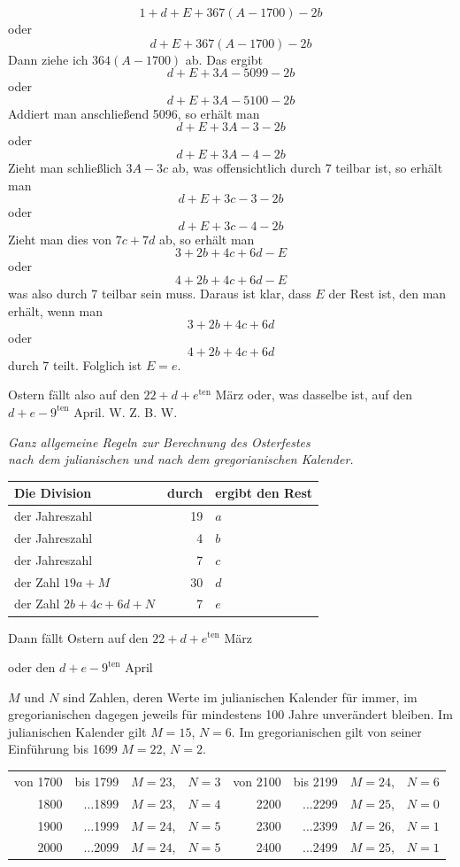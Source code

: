 %
\begingroup{}
\[
1+d+E+367(A-1700)-2b
\]
\endgroup
oder
\[
d+E+367(A-1700)-2b
\]
Dann ziehe ich $364(A-1700)$ ab. Das ergibt
\[
d+E+3A-5099-2b
\]
oder
\[
d+E+3A-5100-2b
\]
Addiert man anschließend 5096, so erhält man
\[
d+E+3A-3-2b
\]
oder
\[
d+E+3A-4-2b
\]
Zieht man schließlich $3A-3c$ ab, was offensichtlich durch 7 teilbar ist, so erhält man
\[
d+E+3c-3-2b
\]
oder
\[
d+E+3c-4-2b
\]
Zieht man dies von $7c+7d$ ab, so erhält man
\[
3+2b+4c+6d-E
\]
oder
\[
4+2b+4c+6d-E
\]
was also durch 7 teilbar sein muss. Daraus ist klar, dass $E$ der Rest ist, den man erhält, wenn man
\[
3+2b+4c+6d
\]
oder
\[
4+2b+4c+6d
\]
durch 7 teilt. Folglich ist $E=e$.

Ostern fällt also auf den $22+d+e^{\mathrm{ten}}$ März oder, was dasselbe ist, auf den $d+e-9^{\mathrm{ten}}$ April. W. Z. B. W.

%
\begin{center}\textit{Ganz allgemeine Regeln zur Berechnung des Osterfestes\\
nach dem julianischen und nach dem gregorianischen Kalender.}\end{center}
\begin{center}
\begin{tabular}{l|r|l}
Die Division & durch & ergibt den Rest\\\hline
der Jahreszahl & 19 & $a$\\
der Jahreszahl & 4 & $b$\\
der Jahreszahl & 7 & $c$\\
der Zahl $19a+M$ & 30 & $d$\\
der Zahl $2b+4c+6d+N$ & 7 & $e$\\\hline
\end{tabular}\par
Dann fällt Ostern auf den $22+d+e^{\mathrm{ten}}$ März\par
oder den $d+e-9^{\mathrm{ten}}$ April
\end{center}

$M$ und $N$ sind Zahlen, deren Werte im julianischen Kalender für immer, im gregorianischen dagegen jeweils für mindestens 100 Jahre unverändert bleiben. Im julianischen Kalender gilt $M=15$, $N=6$. Im gregorianischen gilt von seiner Einführung bis 1699 $M=22$, $N=2$.

\begin{center}\small
\setlength{\tabcolsep}{5pt}\begin{tabular}{rrll|rrll}
von 1700 & bis 1799 & $M=23$, & $N=3$ & von 2100 & bis 2199 & $M=24$, & $N=6$\\
1800 & $\ldots$1899 & $M=23$, & $N=4$ & 2200 & $\ldots$2299 & $M=25$, & $N=0$\\
1900 & $\ldots$1999 & $M=24$, & $N=5$ & 2300 & $\ldots$2399 & $M=26$, & $N=1$\\
2000 & $\ldots$2099 & $M=24$, & $N=5$ & 2400 & $\ldots$2499 & $M=25$, & $N=1$
\end{tabular}
\end{center}

